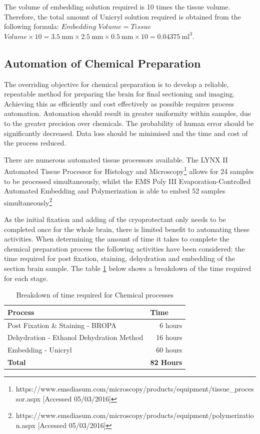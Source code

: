 \documentclass[a4paper, 11pt]{article}
\numberwithin{equation}{section}
\begin{document}
The volume of embedding solution required is 10 times the tissue volume. Therefore, the total amount of Unicryl solution required is obtained from the following formula: $Embedding$ $Volume = Tissue$ $Volume \times 10 = \SI{3.5}{\milli\metre} \times \SI{2.5}{\milli\metre} \times \SI{0.5}{\milli\metre} \times 10= \SI{0.04375}{\milli\litre\cubed}$.

\subsection{Automation of Chemical Preparation}
The overriding objective for chemical preparation is to develop a reliable, repeatable method for preparing the brain for final sectioning and imaging. Achieving this as efficiently and cost effectively as possible requires process automation. Automation should result in greater uniformity within samples, due to the greater precision over chemicals. The probability of human error should be significantly decreased. Data loss should be minimised and the time and cost of the process reduced.

There are numerous automated tissue processors available. The LYNX II Automated Tissue Processor for Histology and Microscopy\footnote{https://www.emsdiasum.com/microscopy/products/equipment/tissue\_processor.aspx [Accessed 05/03/2016]} allows for 24 samples to be processed simultaneously, whilst the EMS Poly III Evaporation-Controlled Automated Embedding and Polymerization is able to embed 52 samples simultaneously\footnote{https://www.emsdiasum.com/microscopy/products/equipment/polymerization.aspx [Accessed 05/03/2016]}

As the initial fixation and adding of the cryoprotectant only needs to be completed once for the whole brain, there is limited benefit to automating these activities. When determining the amount of time it takes to complete the chemical preparation process the following activities have been considered: the time required for post fixation, staining, dehydration and embedding of the section brain sample. The table \ref{chemprocesstime} below shows a breakdown of the time required for each stage.

\begin{table}[h]
	\centering
	\begin{tabular}{|l|l|}
		\hline
		\textbf{Process} & \textbf{Time} \\ \hline
		Post Fixation \& Staining - BROPA &  \multicolumn{1}{r|}{6 hours} \\ \hline
		Dehydration - Ethanol Dehydration Method &\multicolumn{1}{r|}{16 hours} \\ \hline
		Embedding - Unicryl & \multicolumn{1}{r|}{60 hours} \\ \hline
		\textbf{Total} & \multicolumn{1}{r|}{\textbf{82 Hours}} \\ \hline
	\end{tabular}
	\caption{Breakdown of time required for Chemical processes}
	\label{chemprocesstime}
\end{table}
\end{document}
